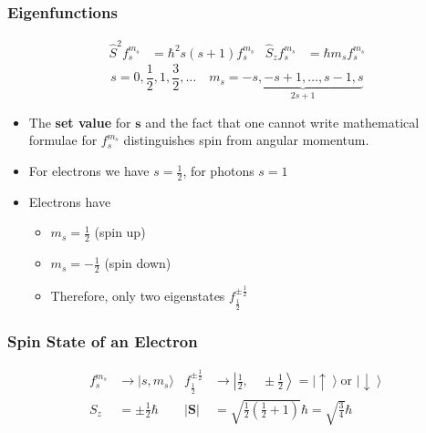 \subsubsection{Eigenfunctions}

\noindent\begin{align*}
    \widehat{S}^2f_{s}^{m_s}   & =\hbar^{2}s (s+1) f_{s}^{m_s} &
    \widehat{S}_{z}f_{s}^{m_s} & =\hbar m_s f_{s}^{m_s}
\end{align*}
\begin{equation*}
    s =0,\frac{1}{2},1,\frac{3}{2},\dots \quad m_s =\underbrace{-s, -s+1,\dots, s-1, s}_{2s+1}
\end{equation*}

\begin{itemize}
    \item The \textbf{set value} for $\mathbf{s}$ and the fact that one cannot write mathematical formulae for $f_{s}^{m_s}$ distinguishes spin from angular momentum.
    \item For electrons we have $s=\frac{1}{2}$, for photons $s=1$
    \item Electrons have
          \begin{itemize}
              \item $m_s=\frac{1}{2}$ (spin up)
              \item $m_s=-\frac{1}{2}$ (spin down)
              \item Therefore, only two eigenstates $f_{\frac{1}{2}}^{\pm \frac{1}{2}}$
          \end{itemize}
\end{itemize}

\subsubsection{Spin State of an Electron}
\noindent\begin{align*}
    f_{s}^{m_{s}}                    & \rightarrow|s,m_{s}\rangle                                                                                         &
    f_{\frac{1}{2}}^{\pm\frac{1}{2}} & \rightarrow\left|\frac{1}{2},\quad \pm\frac{1}{2}\right>= \left|\uparrow\right> \text{or } \left|\downarrow\right>   \\
    S_z                              & =\pm \frac{1}{2}\hbar                                                                                              &
    |\mathbf{S}|                     & =\sqrt{\frac{1}{2}\left(\frac{1}{2}+1\right)}\hbar=\sqrt{\frac{3}{4}}\hbar
\end{align*}

